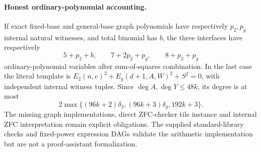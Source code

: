\paragraph{Honest ordinary-polynomial accounting.}
If exact fixed-base and general-base graph polynomials have respectively
$p_2,p_g$ internal natural witnesses, and total binomial has $b$, the
three interfaces have respectively
\[
 5+p_2+b,\qquad 7+2p_2+p_g,\qquad 8+p_2+p_g
\]
ordinary-polynomial variables after sum-of-squares combination. In the last
case the literal template is $E_2(n,e)^2+E_g(d+1,A,W)^2+S^2=0$, with
independent internal witness tuples. Since $\deg A,\deg Y\leq48k$, its
degree is at most
\[
 2\max\{(96k+2)\delta_2,(96k+3)\delta_g,192k+3\}.
\]
The missing graph implementations, direct ZFC-checker tile instance and
internal ZFC interpretation remain explicit obligations. The supplied
standard-library checks and fixed-power expression DAGs validate the
arithmetic implementation but are not a proof-assistant formalization.

